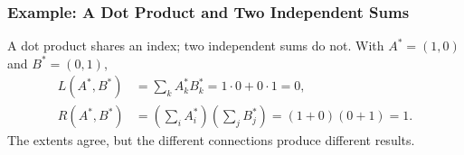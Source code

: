 \subsubsection{Example: A Dot Product and Two Independent Sums}
A dot product shares an index; two independent sums do not. With
$A^*=(1,0)$ and $B^*=(0,1)$,
\begin{equation}
\begin{aligned}
 L(A^*,B^*)&=\sum_k A^*_k B^*_k=1\cdot0+0\cdot1=0,\\
 R(A^*,B^*)&=\left(\sum_i A^*_i\right)
             \left(\sum_j B^*_j\right)=(1+0)(0+1)=1.
\end{aligned}
\end{equation}
The extents agree, but the different connections produce different results.
